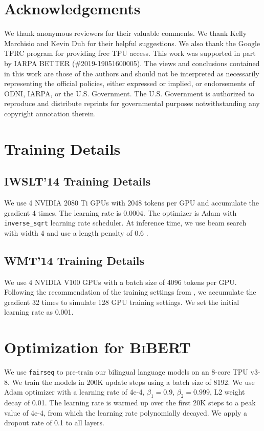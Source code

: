 \documentclass[11pt]{article}
\begin{document}
\section*{Acknowledgements}
We thank anonymous reviewers for their valuable comments. We thank Kelly Marchisio and Kevin Duh for their helpful suggestions. We also thank the Google TFRC program for providing free TPU access. This work was supported in part by IARPA BETTER (\#2019-19051600005). The views and conclusions contained in this work are those of the authors and should not be interpreted as necessarily representing the official policies, either expressed or implied, or endorsements of ODNI, IARPA, or the U.S. Government. The U.S. Government is authorized to reproduce and distribute reprints for governmental purposes notwithstanding any copyright annotation therein.




\clearpage

\appendix
\section{Training Details}
\label{app:training}
\subsection{IWSLT'14 Training Details}
We use 4 NVIDIA 2080 Ti GPUs with 2048 tokens per GPU and accumulate the gradient 4 times. The learning rate is 0.0004. The optimizer is Adam \citep{kingma2014adam} with \texttt{inverse\_sqrt} learning rate scheduler. At inference time, we use beam search with width 4 and use a length penalty of 0.6 \citep{boulanger2013audio,wu2016google,koehn-knowles-2017-six}. 

\subsection{WMT'14 Training Details}
We use 4 NVIDIA V100 GPUs with a batch size of 4096 tokens per GPU. Following the recommendation of the training settings from \citet{ott-etal-2018-scaling}, we accumulate the gradient 32 times to simulate 128 GPU training settings. We set the initial learning rate as 0.001.

\section{Optimization for \textsc{BiBERT}}
\label{app:optimization}
We use \texttt{fairseq} to pre-train our bilingual language models on an 8-core TPU v3-8. We train the models in 200K update steps using a batch size of 8192. We use Adam optimizer \citep{kingma2014adam} with a learning rate of 4e-4, $\beta_1 = 0.9$, $\beta_2 = 0.999$, L2 weight decay of 0.01. The learning rate is warmed up over the first 20K steps to a peak value of 4e-4, from which the learning rate polynomially decayed. We apply a dropout rate of 0.1 to all layers.
\end{document}

